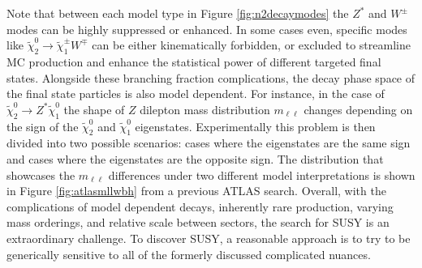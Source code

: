 Note that between each model type in Figure \ref{fig:n2decaymodes} the $Z^*$ and $W^\pm$ modes can be highly suppressed or enhanced. In some cases even, specific modes like $\tilde{\chi}^0_2\rightarrow \tilde{\chi}_1^\pm W^\mp$ can be either kinematically forbidden, or excluded to streamline MC production and enhance the statistical power of different targeted final states. Alongside these branching fraction complications, the decay phase space of the final state particles is also model dependent. For instance, in the case of $\tilde{\chi}^0_2 \rightarrow Z^*\tilde{\chi}^0_1 $ the shape of $Z$ dilepton mass distribution $m_{\ell\ell}$  changes depending on the sign of the $\tilde{\chi}_2^0$ and $\tilde{\chi}_1^0$ eigenstates. Experimentally this problem is then divided into two possible scenarios: cases where the eigenstates are the same sign and cases where the eigenstates are the opposite sign. The distribution that showcases the $m_{\ell\ell}$ differences under two different model interpretations is shown in Figure \ref{fig:atlasmllwbh} from a previous ATLAS search. Overall, with the complications of model dependent decays, inherently rare production, varying mass orderings, and relative scale between sectors, the search for SUSY is an extraordinary challenge. To discover SUSY, a reasonable approach is to try to be generically sensitive to all of the formerly discussed complicated nuances. 






